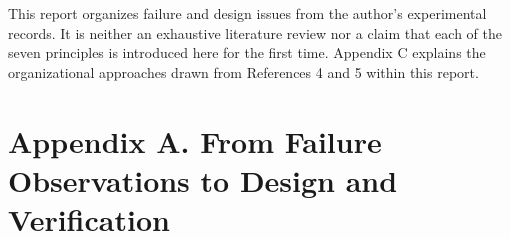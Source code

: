 \documentclass[10pt,a4paper]{article}
\newlength{\usable}
\begin{document}
This report organizes failure and design issues from the author's experimental records. It is neither an exhaustive literature review nor a claim that each of the seven principles is introduced here for the first time. Appendix C explains the organizational approaches drawn from References 4 and 5 within this report.

\endgroup

\clearpage

\section{Appendix A. From Failure Observations to Design and Verification}\label{two-role-failure-design-appendix-a.-from-failure-observations-to-design-and-verification}

\Needspace{115pt}
\begingroup\fontsize{9.1}{12}\selectfont\setlength{\parskip}{1pt}
\setlength{\usable}{\dimexpr\linewidth-4\tabcolsep\relax}
\end{document}
